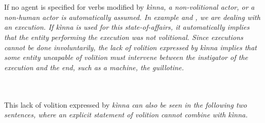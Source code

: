  \\

 \\
% 
% 
% 

If no agent is specified for verbs modified by \em kìnna\em, a non-volitional actor, or a non-human actor is automatically assumed. In example  and , we are dealing with an execution. If \em kìnna \em is used for this state-of-affairs, it automatically implies that the entity performing the execution was not volitional. Since executions cannot be done involuntarily, the lack of volition expressed by \em kìnna \em implies that some entity uncapable of volition must intervene between the instigator of the execution and the end, such as a machine, the guillotine.

 \\
 \\

This lack of volition expressed by \em kìnna \em can also be seen in the following two sentences, where an explicit statement of volition  cannot combine with \em kìnna\em.

